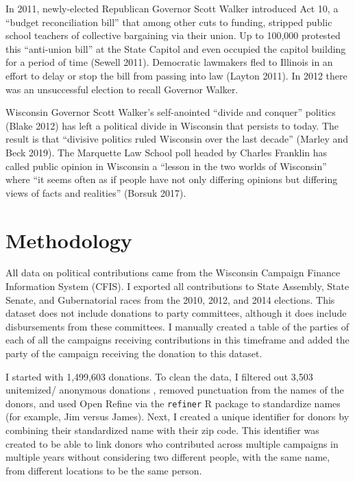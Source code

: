 \documentclass[12pt,]{article}
\begin{document}
In 2011, newly-elected Republican Governor Scott Walker introduced Act
10, a ``budget reconciliation bill'' that among other cuts to funding,
stripped public school teachers of collective bargaining via their
union. Up to 100,000 protested this ``anti-union bill'' at the State
Capitol and even occupied the capitol building for a period of time
(Sewell 2011). Democratic lawmakers fled to Illinois in an effort to
delay or stop the bill from passing into law (Layton 2011). In 2012
there was an unsuccessful election to recall Governor Walker.

Wisconsin Governor Scott Walker's self-anointed ``divide and conquer''
politics (Blake 2012) has left a political divide in Wisconsin that
persists to today. The result is that ``divisive politics ruled
Wisconsin over the last decade'' (Marley and Beck 2019). The Marquette
Law School poll headed by Charles Franklin has called public opinion in
Wisconsin a ``lesson in the two worlds of Wisconsin'' where ``it seems
often as if people have not only differing opinions but differing views
of facts and realities'' (Borsuk 2017).

\hypertarget{methodology}{%
\section{Methodology}\label{methodology}}

All data on political contributions came from the Wisconsin Campaign
Finance Information System (CFIS). I exported all contributions to State
Assembly, State Senate, and Gubernatorial races from the 2010, 2012, and
2014 elections. This dataset does not include donations to party
committees, although it does include disbursements from these
committees. I manually created a table of the parties of each of all the
campaigns receiving contributions in this timeframe and added the party
of the campaign receiving the donation to this dataset.

I started with 1,499,603 donations. To clean the data, I filtered out
3,503 unitemized/ anonymous donations , removed punctuation from the
names of the donors, and used Open Refine via the \texttt{refiner} R
package to standardize names (for example, Jim versus James). Next, I
created a unique identifier for donors by combining their standardized
name with their zip code. This identifier was created to be able to link
donors who contributed across multiple campaigns in multiple years
without considering two different people, with the same name, from
different locations to be the same person.
\end{document}
